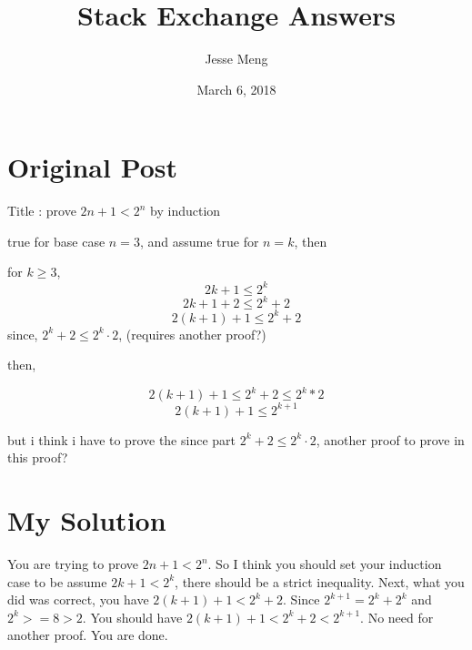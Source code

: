 \documentclass{article}
\title{Stack Exchange Answers}
\author{Jesse Meng }
\date{March 6, 2018}
\begin{document}
\maketitle

\section{Original Post}
Title : prove $2n+1 < 2^{n}$ by induction

true for base case $n = 3$, and assume true for $n=k$, then

for $k \geq 3$,
$$2k+1 \leq 2^{k}$$
$$2k+1 + 2 \leq 2^{k} +2$$
$$2(k+1) +1 \leq 2^{k} +2$$
since, $2^{k} +2 \leq 2^{k}\cdot2$, (requires another proof?)

then,

$$2(k+1) +1 \leq 2^{k} +2 \leq 2^{k}*2$$
$$2(k+1) +1  \leq 2^{k+1}$$

but i think i have to prove the since part $2^{k} +2 \leq 2^{k}\cdot2$, another proof to prove in this proof?
\section{My Solution}
You are trying to prove $2n+1 < 2^n$. So I think you should set your induction case to be assume $2k+1 < 2^k$, there should be a strict inequality. Next, what you did was correct, you have $2(k+1)+1 < 2^k+2$. Since $2^{k+1}=2^k+2^k$ and $2^k>=8>2$. You should have $2(k+1)+1 < 2^k+2<2^{k+1}$. No need for another proof. You are done.
\end{document}
